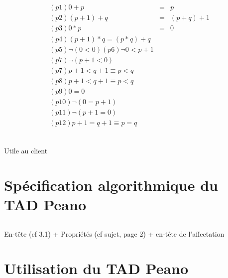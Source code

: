 \documentclass{article}
\begin{document}
		\subsection{}
			\begin{eqnarray*}
				(p1) 0+p&=&p\\
				(p2) (p+1)+q&=&(p+q)+1\\
				(p3) 0*p&=&0\\
				(p4) (p+1)*q=(p*q)+q\\
				(p5) \neg (0 < 0) 
				(p6) \neg 0 < p+1\\
				(p7) \neg (p + 1 < 0)\\
				(p7) p + 1 < q + 1 \equiv p < q \\
				(p8) p+1 < q+1 \equiv p < q\\
				(p9) 0=0\\
				(p10) \neg(0=p+1)\\
				(p11) \neg(p+1=0)\\
				(p12) p+1 = q+1 \equiv p=q\\
			\end{eqnarray*}	
		\subsection{}
				
			Utile au client
	\section{Spécification algorithmique du TAD Peano}
		\subsection{}
				
		\subsection{}
			En-tête (cf 3.1) + Propriétés (cf sujet, page 2) + en-tête de l'affectation
		\subsection{}
				
	\section{Utilisation du TAD Peano}
		\newpage
		\subsection{}
				
\end{document}
